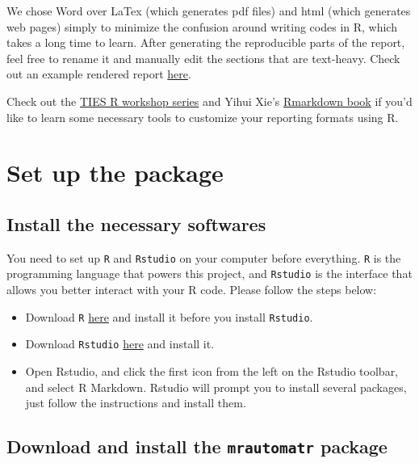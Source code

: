 \documentclass[
]{book}
\providecommand{\tightlist}{%
  \setlength{\itemsep}{0pt}\setlength{\parskip}{0pt}}
\begin{document}
We chose Word over LaTex (which generates pdf files) and html (which generates web pages) simply to minimize the confusion around writing codes in R, which takes a long time to learn. After generating the reproducible parts of the report, feel free to rename it and manually edit the sections that are text-heavy. Check out an example rendered report \href{https://nyu.box.com/s/wbwcqj3u2x9y6levrwgn9przp7ptr5hp}{here}.

Check out the \href{https://github.com/nyuglobalties/workshops}{TIES R workshop series} and Yihui Xie's \href{https://bookdown.org/yihui/rmarkdown/}{Rmarkdown book} if you'd like to learn some necessary tools to customize your reporting formats using R.

\hypertarget{set-up-the-package}{%
\chapter{Set up the package}\label{set-up-the-package}}

\hypertarget{install-the-necessary-softwares}{%
\section{Install the necessary softwares}\label{install-the-necessary-softwares}}

You need to set up \texttt{R} and \texttt{Rstudio} on your computer before everything. \texttt{R} is the programming language that powers this project, and \texttt{Rstudio} is the interface that allows you better interact with your R code. Please follow the steps below:

\begin{itemize}
\tightlist
\item
  Download \texttt{R} \href{https://cran.r-project.org/mirrors.html}{here} and install it before you install \texttt{Rstudio}.
\item
  Download \texttt{Rstudio} \href{https://rstudio.com/products/rstudio/download/\#download}{here} and install it.
\item
  Open Rstudio, and click the first icon from the left on the Rstudio toolbar, and select R Markdown. Rstudio will prompt you to install several packages, just follow the instructions and install them.
\end{itemize}

\hypertarget{download-and-install-the-mrautomatr-package}{%
\section{\texorpdfstring{Download and install the \texttt{mrautomatr} package}{Download and install the mrautomatr package}}\label{download-and-install-the-mrautomatr-package}}
\end{document}
